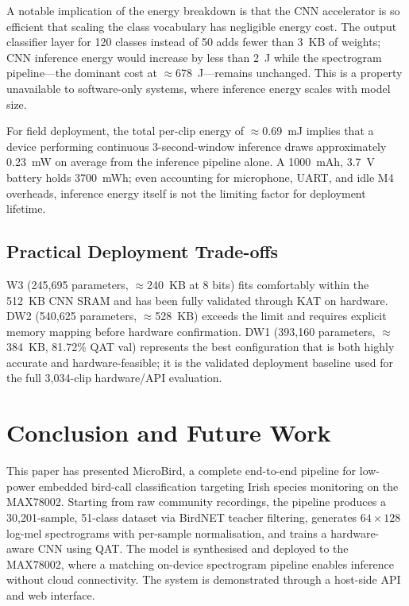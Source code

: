 \documentclass[conference]{IEEEtran}
\begin{document}
A notable implication of the energy breakdown is that the CNN accelerator is so efficient that scaling the class vocabulary has negligible energy cost. The output classifier layer for 120 classes instead of 50 adds fewer than 3~KB of weights; CNN inference energy would increase by less than 2~\textmu J while the spectrogram pipeline---the dominant cost at $\approx$678~\textmu J---remains unchanged. This is a property unavailable to software-only systems, where inference energy scales with model size.

For field deployment, the total per-clip energy of $\approx$0.69~mJ implies that a device performing continuous 3-second-window inference draws approximately 0.23~mW on average from the inference pipeline alone. A 1000~mAh, 3.7~V battery holds 3700~mWh; even accounting for microphone, UART, and idle M4 overheads, inference energy itself is not the limiting factor for deployment lifetime.

\subsection{Practical Deployment Trade-offs}
W3 (245,695 parameters, $\approx$240~KB at 8 bits) fits comfortably within the 512~KB CNN SRAM and has been fully validated through KAT on hardware. DW2 (540,625 parameters, $\approx$528~KB) exceeds the limit and requires explicit memory mapping before hardware confirmation. DW1 (393,160 parameters, $\approx$384~KB, 81.72\% QAT val) represents the best configuration that is both highly accurate and hardware-feasible; it is the validated deployment baseline used for the full 3,034-clip hardware/API evaluation.

\section{Conclusion and Future Work}

This paper has presented MicroBird, a complete end-to-end pipeline for low-power embedded bird-call classification targeting Irish species monitoring on the MAX78002. Starting from raw community recordings, the pipeline produces a 30,201-sample, 51-class dataset via BirdNET teacher filtering, generates $64 \times 128$ log-mel spectrograms with per-sample normalisation, and trains a hardware-aware CNN using QAT. The model is synthesised and deployed to the MAX78002, where a matching on-device spectrogram pipeline enables inference without cloud connectivity. The system is demonstrated through a host-side API and web interface.
\end{document}
